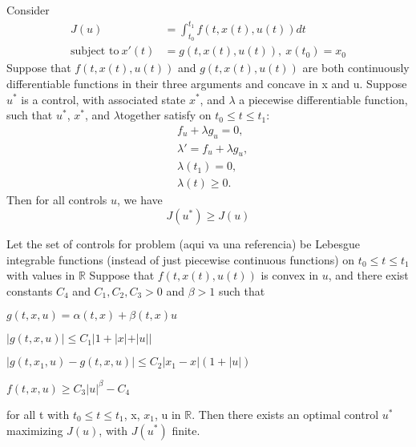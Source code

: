 \begin{theorem}
	Consider
    \begin{align*}
    	J(u) &= \int_{t_0}^{t_1} f(t,x(t),u(t))dt \\
        \text{subject to} \ x'(t) &= g(t,x(t),u(t)), \ x(t_0) = x_0 
    \end{align*}
    Suppose that $f(t,x(t),u(t))$ and $g(t,x(t),u(t))$ are both continuously 
    differentiable functions in their three arguments and concave in x and u. 
    Suppose $u^{*}$ is a control, with associated state $x^{*}$, and $\lambda$
    a piecewise differentiable function, such that $u^{*}$, $x^{*}$, and 
    $\lambda$together satisfy on $t_0 \leq t \leq t_1$:
    \begin{align*}
    	& f_{u} + \lambda g_{u} = 0, \\
        & \lambda ' = f_{u} + \lambda g_{u}, \\
        & \lambda (t_1) = 0, \\
        & \lambda (t) \geq 0.
    \end{align*}
    Then for all controls $u$, we have
    $$
    	J(u^{*}) \geq J(u)
    $$
\end{theorem}

\begin{theorem}
	Let the set of controls for problem (aqui va una referencia) be Lebesgue
    integrable functions (instead of just piecewise continuous functions) on
    $t_0 \leq t \leq t_1$ with values in $\mathbb{R}$ Suppose that 
    $f(t,x(t),u(t))$ is convex in $u$, and there exist constants $C_4$ and
    $C_1, C_2, C_3 > 0$ and $\beta > 1$ such that
    \begin{asparaenum}[i.]
    	\item
        	$g(t,x,u) = \alpha (t,x) + \beta (t,x)u$
        \item
        	$|g(t,x,u)| \leq C_1 |1 + |x| + |u||$
        \item
        	$|g(t,x_1,u) - g(t,x,u)| \leq C_2 |x_1 - x|(1 + |u|)$
        \item
        	$f(t,x,u) \geq C_3 |u|^{\beta} - C_4$
    \end{asparaenum}
	for all t with $t_0 \leq t \leq t_1$, x, $x_1$, u in $\mathbb{R}$. Then 
    there exists an optimal control $u^{*}$ maximizing $J(u)$, with $J(u^{*})$
    finite.
\end{theorem}
